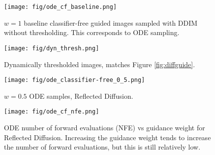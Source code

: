 \documentclass{article}
\theoremstyle{plain}
\theoremstyle{definition}
\theoremstyle{remark}
\begin{document}
\begin{figure}[H]
    \centering
    \texttt{[image: fig/ode\_cf\_baseline.png]}
    \caption{$w=1$ baseline classifier-free guided images sampled with DDIM without thresholding. This corresponds to ODE sampling.}
    \label{fig:app:ode_cf_baseline}
\end{figure}

\begin{figure}[H]
    \centering
    \texttt{[image: fig/dyn\_thresh.png]}
    \caption{Dynamically thresholded images, matches Figure \ref{fig:diffguide}.}
\end{figure}

\begin{figure}[H]
    \centering
    \texttt{[image: fig/ode\_classifier-free\_0\_5.png]}
    \caption{$w=0.5$ ODE samples, Reflected Diffusion.}
    \label{fig:app:0.5ode}
\end{figure}

\begin{figure}[H]
    \centering
    \texttt{[image: fig/ode\_cf\_nfe.png]}
    \caption{ODE number of forward evaluations (NFE) vs guidance weight for Reflected Diffusion. Increasing the guidance weight tends to increase the number of forward evaluations, but this is still relatively low.}
    \label{fig:app:ode_nfe}
\end{figure} 
\end{document}
